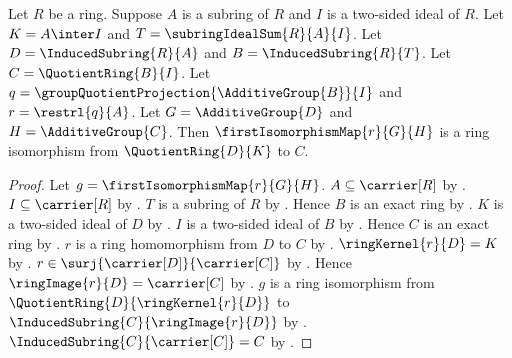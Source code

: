 \begin{theorem}\label{ring_second_isomorphism_theorem}
    Let $R$ be a ring.
    Suppose $A$ is a subring of $R$ and
        $I$ is a two-sided ideal of $R$.
    Let $K=A\inter I$ and $T=\subringIdealSum{R}{A}{I}$.
    Let $D=\InducedSubring{R}{A}$ and $B=\InducedSubring{R}{T}$.
    Let $C=\QuotientRing{B}{I}$.
    Let $q=\groupQuotientProjection{\AdditiveGroup{B}}{I}$ and
        $r=\restrl{q}{A}$.
    Let $G=\AdditiveGroup{D}$ and $H=\AdditiveGroup{C}$.
    Then $\firstIsomorphismMap{r}{G}{H}$ is a ring isomorphism from
        $\QuotientRing{D}{K}$ to $C$.
\end{theorem}
\begin{proof}
    Let $g=\firstIsomorphismMap{r}{G}{H}$.
    $A\subseteq\carrier[R]$ by .
    $I\subseteq\carrier[R]$ by
        .
    $T$ is a subring of $R$ by .
    Hence $B$ is an exact ring by .
    $K$ is a two-sided ideal of $D$ by
        .
    $I$ is a two-sided ideal of $B$ by
        .
    Hence $C$ is an exact ring by .
    $r$ is a ring homomorphism from $D$ to $C$ by
        .
    $\ringKernel{r}{D}=K$ by
        .
    $r\in\surj{\carrier[D]}{\carrier[C]}$ by
        .
    Hence $\ringImage{r}{D}=\carrier[C]$ by
        .
    $g$ is a ring isomorphism from
        $\QuotientRing{D}{\ringKernel{r}{D}}$ to
        $\InducedSubring{C}{\ringImage{r}{D}}$ by
        .
    $\InducedSubring{C}{\carrier[C]}=C$ by
        .
\end{proof}

